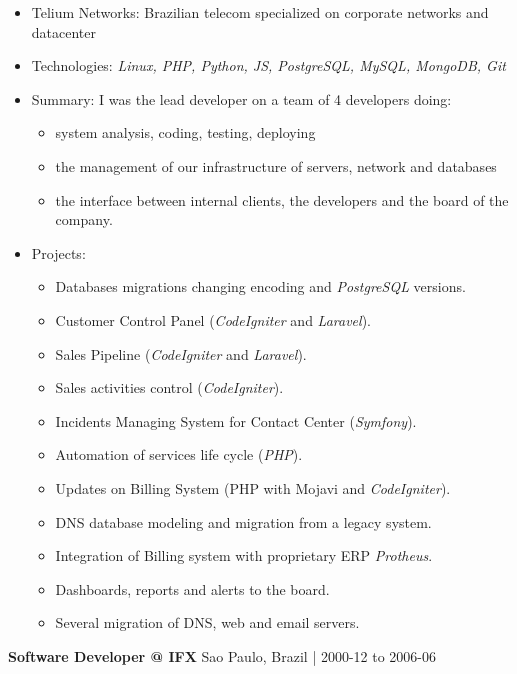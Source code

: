 \documentclass[margin,a4paper]{res}
\def\tightlist{}
\begin{document}
{\begin{itemize}
\tightlist
\item
  Telium Networks: Brazilian telecom specialized on corporate networks
  and datacenter
\item
  Technologies: \emph{Linux, PHP, Python, JS, PostgreSQL, MySQL,
  MongoDB, Git}
\item
  Summary: I was the lead developer on a team of 4 developers doing:

  \begin{itemize}
  \tightlist
  \item
    system analysis, coding, testing, deploying
  \item
    the management of our infrastructure of servers, network and
    databases
  \item
    the interface between internal clients, the developers and the board
    of the company.
  \end{itemize}
\item
  Projects:

  \begin{itemize}
  \tightlist
  \item
    Databases migrations changing encoding and \emph{PostgreSQL}
    versions.
  \item
    Customer Control Panel (\emph{CodeIgniter} and \emph{Laravel}).
  \item
    Sales Pipeline (\emph{CodeIgniter} and \emph{Laravel}).
  \item
    Sales activities control (\emph{CodeIgniter}).
  \item
    Incidents Managing System for Contact Center (\emph{Symfony}).
  \item
    Automation of services life cycle (\emph{PHP}).
  \item
    Updates on Billing System (PHP with Mojavi and \emph{CodeIgniter}).
  \item
    DNS database modeling and migration from a legacy system.
  \item
    Integration of Billing system with proprietary ERP \emph{Protheus}.
  \item
    Dashboards, reports and alerts to the board.
  \item
    Several migration of DNS, web and email servers.
  \end{itemize}
\end{itemize}

\textbf{Software Developer @ IFX} \hfill Sao Paulo, Brazil | 2000-12
to 2006-06

}
\end{document}
